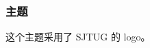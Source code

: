 \documentclass{ctexbeamer}
\begin{document}
    \maketitle
    \begin{frame}
        \frametitle{\sjtugtext 主题}
        这个主题采用了 SJTUG 的 logo。
    \end{frame}
    \makebottom
\end{document}
